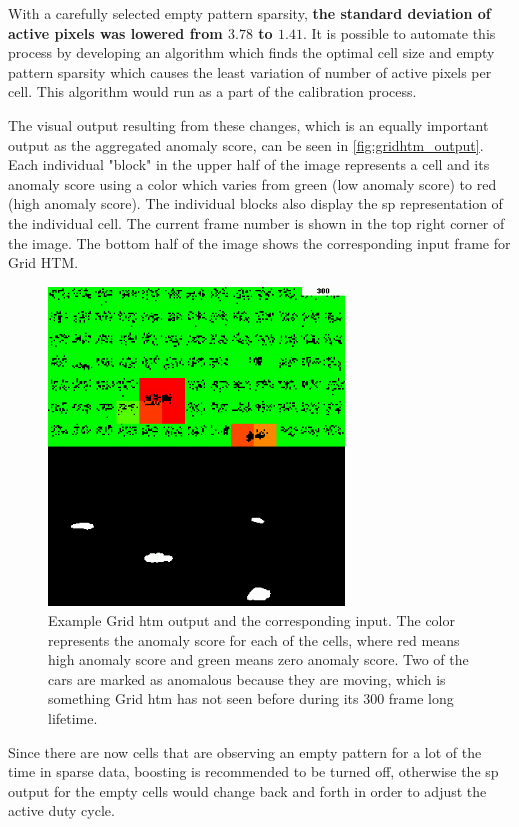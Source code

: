 With a carefully selected empty pattern sparsity, \textbf{the standard deviation of active pixels was lowered from $\mathbf{3.78}$ to $\mathbf{1.41}$}. It is possible to automate this process by developing an algorithm which finds the optimal cell size and empty pattern sparsity which causes the least variation of number of active pixels per cell. This algorithm would run as a part of the calibration process.\par
The visual output resulting from these changes, which is an equally important output as the aggregated anomaly score, can be seen in \autoref{fig:gridhtm_output}. Each individual "block" in the upper half of the image represents a cell and its anomaly score using a color which varies from green (low anomaly score) to red (high anomaly score). The individual blocks also display the \gls*{sp} representation of the individual cell. The current frame number is shown in the top right corner of the image. The bottom half of the image shows the corresponding input frame for Grid HTM.
\begin{figure}[H]
    \centering
    \includegraphics[width=0.7\textwidth]{resources/methodology/htm_grid_output.png}
    \caption[Example Grid HTM Output]{Example Grid \gls*{htm} output and the corresponding input. The color represents the anomaly score for each of the cells, where red means high anomaly score and green means zero anomaly score. Two of the cars are marked as anomalous because they are moving, which is something Grid \gls*{htm} has not seen before during its 300 frame long lifetime.}
    \label{fig:gridhtm_output}
\end{figure}
Since there are now cells that are observing an empty pattern for a lot of the time in sparse data, boosting is recommended to be turned off, otherwise the \gls*{sp} output for the empty cells would change back and forth in order to adjust the active duty cycle.
